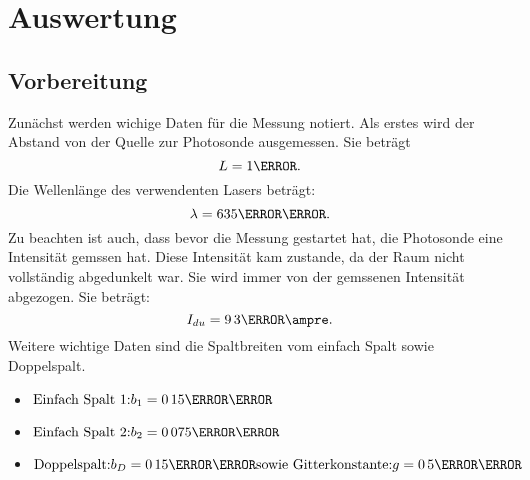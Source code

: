 \section{Auswertung}
\subsection{Vorbereitung}
Zunächst werden wichige Daten für die Messung notiert.
Als erstes wird der Abstand von der Quelle zur Photosonde ausgemessen.
Sie beträgt
\begin{equation*}
  L = \si{1}{\meter}.
\end{equation*}
Die Wellenlänge des verwendenten Lasers beträgt:
\begin{equation*}
  \lambda = \si{635}{\nano\meter}.
\end{equation*}
Zu beachten ist auch, dass bevor die Messung gestartet hat, die Photosonde eine
Intensität gemssen hat. Diese Intensität kam zustande, da der Raum nicht vollständig
abgedunkelt war. Sie wird immer von der gemssenen Intensität abgezogen.
Sie beträgt:
\begin{equation*}
  I_{du} = \si{9.3}{\nano\ampre}.
\end{equation*}
Weitere wichtige Daten sind die Spaltbreiten vom einfach Spalt sowie Doppelspalt.
\begin{itemize}
  \item $\text{Einfach Spalt 1:} b_1 = \si{0.15}{\milli\meter}$
  \item $\text{Einfach Spalt 2:} b_2 = \si{0.075}{\milli\meter}$
  \item $\text{Doppelspalt:} b_D = \si{0.15}{\milli\meter} \text{sowie Gitterkonstante:} g = \si{0.5}{\milli\meter}$
\end{itemize}
